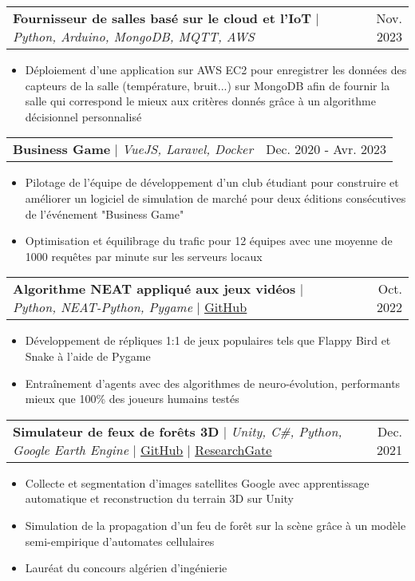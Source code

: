 \documentclass[letterpaper,10.5t]{article}
\makeatletter
\newcommand{\resumeItem}[1]{
  \item\small{
    {#1 \vspace{-2pt}}
  }
}
\newcommand{\resumeProjectHeading}[2]{
    \item
    \begin{tabular*}{0.97\textwidth}{l@{\extracolsep{\fill}}r}
      \small#1 & #2 \\
    \end{tabular*}\vspace{-7pt}
}
\newcommand{\resumeItemListStart}{\begin{itemize}}
\newcommand{\resumeItemListEnd}{\end{itemize}\vspace{-5pt}}
\makeatother
\begin{document}
        \resumeProjectHeading
        {\textbf{Fournisseur de salles basé sur le cloud et l'IoT} $|$ \emph{Python, Arduino, MongoDB, MQTT, AWS}}{Nov. 2023}
            \resumeItemListStart
                \resumeItem{Déploiement d'une application sur AWS EC2 pour enregistrer les données des capteurs de la salle (température, bruit...) sur MongoDB afin de fournir la salle qui correspond le mieux aux critères donnés grâce à un algorithme décisionnel personnalisé}
            \resumeItemListEnd

        \resumeProjectHeading
        {\textbf{Business Game} $|$ \emph{VueJS, Laravel, Docker}}{Dec. 2020 - Avr. 2023}
            \resumeItemListStart
                \resumeItem{Pilotage de l'équipe de développement d'un club étudiant pour construire et améliorer un logiciel de simulation de marché pour deux éditions consécutives de l'événement "Business Game"}
                \resumeItem{Optimisation et équilibrage du trafic pour 12 équipes avec une moyenne de 1000 requêtes par minute sur les serveurs locaux}
            \resumeItemListEnd
          
        \resumeProjectHeading
        {\textbf{Algorithme NEAT appliqué aux jeux vidéos} $|$ \emph{Python, NEAT-Python, Pygame} $|$ \href{https://github.com/Somnef/snake_neat_ai}{\underline{GitHub}}}{Oct. 2022}
            \resumeItemListStart
                \resumeItem{Développement de répliques 1:1 de jeux populaires tels que Flappy Bird et Snake à l'aide de Pygame}
                \resumeItem{Entraînement d'agents avec des algorithmes de neuro-évolution, performants mieux que 100\% des joueurs humains testés}
            \resumeItemListEnd

        \resumeProjectHeading
            {\textbf{Simulateur de feux de forêts 3D} $|$ \emph{Unity, C\#, Python, Google Earth Engine} $|$ \href{https://github.com/Somnef/semi-empirical-wildfire-simulation}{\underline{GitHub}} $|$ \href{https://www.researchgate.net/publication/354678516_Applying_semi-empirical_simulation_of_wildfire_on_real_world_satellite_imagery_data}{\underline{ResearchGate}}}{Dec. 2021}
                \resumeItemListStart
                    \resumeItem{Collecte et segmentation d'images satellites Google avec apprentissage automatique et reconstruction du terrain 3D sur Unity}
                    \resumeItem{Simulation de la propagation d'un feu de forêt sur la scène grâce à un modèle semi-empirique d'automates cellulaires}
                    \resumeItem{Lauréat du concours algérien d'ingénierie}
                \resumeItemListEnd
\end{document}
